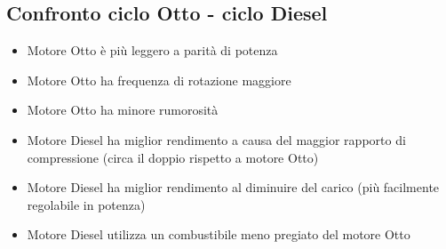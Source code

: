 \subsection{Confronto ciclo Otto - ciclo Diesel}
\begin{itemize}
    \item Motore Otto è più leggero a parità di potenza
    \item Motore Otto ha frequenza di rotazione maggiore
    \item Motore Otto ha minore rumorosità
    \item Motore Diesel ha miglior rendimento a causa del maggior rapporto di compressione (circa il doppio rispetto a motore Otto)
    \item Motore Diesel ha miglior rendimento al diminuire del carico (più facilmente regolabile in potenza)
    \item Motore Diesel utilizza un combustibile meno pregiato del motore Otto
\end{itemize}
